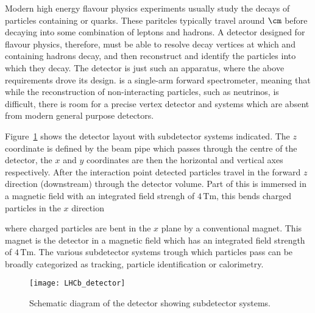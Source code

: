 Modern high energy flavour physics experiments usually study the decays of particles containing
\bquark or \cquark quarks.
These paritcles typically travel around $\cm$ before decaying into some combination of leptons and
hadrons.
A detector designed for flavour physics, therefore, must be able to resolve decay vertices
at which \bquark and \cquark containing hadrons decay, and then reconstruct and identify the particles
into which they decay.
The \lhcb detector is just such an apparatus, where the above requirements drove its design.
\lhcb is a single-arm forward spectrometer, meaning that while
the reconstruction of non-interacting particles, such as neutrinos, is difficult, there is room for
a precise vertex detector and \pid systems which are absent from modern general purpose detectors.

Figure~\ref{fig:lhcb:lhcb} shows the \lhcb detector layout with subdetector systems indicated.
The \lhcb $z$ coordinate is defined by the \lhc beam pipe which passes through the centre of the
detector, the $x$ and $y$ coordinates are then the horizontal and vertical axes respectively.
After the interaction point detected particles travel in the forward $z$ direction (downstream) through the
detector volume.
Part of this is immersed in a magnetic field with an integrated field strengh of $4\,\mathrm{Tm}$,
this bends charged particles in the $x$ direction

where charged particles are bent in the $x$ plane by a conventional magnet.
This magnet is
the detector in a magnetic field which has an integrated field strength of $4\,\mathrm{Tm}$.
The various subdetector systems trough which particles pass can be broadly categorized as tracking,
particle identification or calorimetry.


\begin{figure}
  \begin{center}
    \texttt{[image: LHCb\_detector]}
  \end{center}
  \caption[\lhcb detector]
  {\small
    Schematic diagram of the \lhcb detector showing subdetector systems.
  }
  \label{fig:lhcb:lhcb}
\end{figure}


